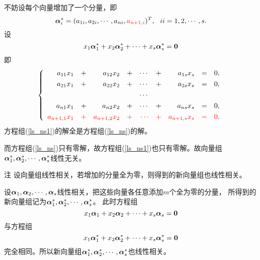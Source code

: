 \begin{frame}
  \begin{footnotesize}
    不妨设每个向量增加了一个分量，即
    $$
    \boldsymbol{\alpha}_i^*= (a_{1i},a_{2i},\cdots,a_{ni},\textcolor{red}{a_{n+1,i}})^T, ~~ ii=1,2,\cdots,s.
    $$ \pause
    设
    $$
    x_1\boldsymbol{\alpha}_1^*+x_2\boldsymbol{\alpha}_2^*+\cdots+x_s\boldsymbol{\alpha}_s^*=\mathbf{0}
    $$
    即
    \begin{equation}\label{ls_ns1}
    \left\{
    \begin{array}{rcrcrcrcr}
      a_{11}x_1&+&a_{12}x_2&+&\cdots&+&a_{1s}x_s&=&0,\\[0.05in]
      a_{21}x_1&+&a_{22}x_2&+&\cdots&+&a_{2s}x_s&=&0,\\[0.05in]
      &&&&\cdots&&&&\\[0.05in]
      a_{n1}x_1&+&a_{n2}x_2&+&\cdots&+&a_{ns}x_s&=&0,\\[0.05in]
      \textcolor{red}{a_{n+1,1}x_1}&\textcolor{red}{+}&\textcolor{red}{a_{n+1,2}x_2}&\textcolor{red}{+}&\textcolor{red}{\cdots}&\textcolor{red}{+}&\textcolor{red}{a_{n+1,s}x_s}&\textcolor{red}{=}&\textcolor{red}{0}.
    \end{array}
    \right.
    \end{equation}
    方程组(\ref{ls_ns1})的解全是方程组(\ref{ls_ns})的解。\pause \vspace{0.2in}

    而方程组(\ref{ls_ns})只有零解，故方程组(\ref{ls_ns1})也只有零解。故向量组$\boldsymbol{\alpha}^*_1,\boldsymbol{\alpha}^*_2,\cdots,\boldsymbol{\alpha}^*_s$线性无关。
  \end{footnotesize}
\end{frame}

\begin{frame}
  \begin{footnotesize}
    \begin{block}{注}
      设向量组线性相关，若增加的分量全为零，则得到的新向量组也线性相关。
    \end{block}
    \pause 
    \proofname
    设$\boldsymbol{\alpha}_1,\boldsymbol{\alpha}_2,\cdots,\boldsymbol{\alpha}_s$线性相关，把这些向量各任意添加$m$个全为零的分量，
    所得到的新向量组记为$\boldsymbol{\alpha}^*_1,\boldsymbol{\alpha}^*_2,\cdots,\boldsymbol{\alpha}^*_s$。\pause 
    此时方程组
    $$
    x_1\boldsymbol{\alpha}_1+x_2\boldsymbol{\alpha}_2+\cdots+x_s\boldsymbol{\alpha}_s=\mathbf{0}
    $$ 
    与方程组
    $$
    x_1\boldsymbol{\alpha}_1^*+x_2\boldsymbol{\alpha}_2^*+\cdots+x_s\boldsymbol{\alpha}_s^*=\mathbf{0}
    $$
    完全相同。所以新向量组$\boldsymbol{\alpha}^*_1,\boldsymbol{\alpha}^*_2,\cdots,\boldsymbol{\alpha}^*_s$也线性相关。
    
  \end{footnotesize}
\end{frame}

